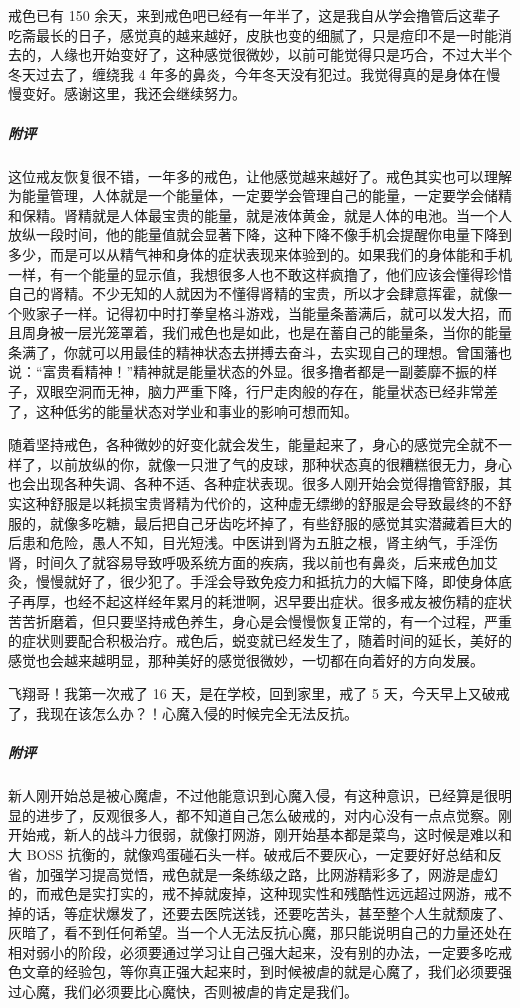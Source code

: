 \begin{case}
    戒色已有 150 余天，来到戒色吧已经有一年半了，这是我自从学会撸管后这辈子吃斋最长的日子，感觉真的越来越好，皮肤也变的细腻了，只是痘印不是一时能消去的，人缘也开始变好了，这种感觉很微妙，以前可能觉得只是巧合，不过大半个冬天过去了，缠绕我 4 年多的鼻炎，今年冬天没有犯过。我觉得真的是身体在慢慢变好。感谢这里，我还会继续努力。
    \subparagraph{附评} 这位戒友恢复很不错，一年多的戒色，让他感觉越来越好了。戒色其实也可以理解为能量管理，人体就是一个能量体，一定要学会管理自己的能量，一定要学会储精和保精。肾精就是人体最宝贵的能量，就是液体黄金，就是人体的电池。当一个人放纵一段时间，他的能量值就会显著下降，这种下降不像手机会提醒你电量下降到多少，而是可以从精气神和身体的症状表现来体验到的。如果我们的身体能和手机一样，有一个能量的显示值，我想很多人也不敢这样疯撸了，他们应该会懂得珍惜自己的肾精。不少无知的人就因为不懂得肾精的宝贵，所以才会肆意挥霍，就像一个败家子一样。记得初中时打拳皇格斗游戏，当能量条蓄满后，就可以发大招，而且周身被一层光笼罩着，我们戒色也是如此，也是在蓄自己的能量条，当你的能量条满了，你就可以用最佳的精神状态去拼搏去奋斗，去实现自己的理想。曾国藩也说：“富贵看精神！”精神就是能量状态的外显。很多撸者都是一副萎靡不振的样子，双眼空洞而无神，脑力严重下降，行尸走肉般的存在，能量状态已经非常差了，这种低劣的能量状态对学业和事业的影响可想而知。

    随着坚持戒色，各种微妙的好变化就会发生，能量起来了，身心的感觉完全就不一样了，以前放纵的你，就像一只泄了气的皮球，那种状态真的很糟糕很无力，身心也会出现各种失调、各种不适、各种症状表现。很多人刚开始会觉得撸管舒服，其实这种舒服是以耗损宝贵肾精为代价的，这种虚无缥缈的舒服是会导致最终的不舒服的，就像多吃糖，最后把自己牙齿吃坏掉了，有些舒服的感觉其实潜藏着巨大的后患和危险，愚人不知，目光短浅。中医讲到肾为五脏之根，肾主纳气，手淫伤肾，时间久了就容易导致呼吸系统方面的疾病，我以前也有鼻炎，后来戒色加艾灸，慢慢就好了，很少犯了。手淫会导致免疫力和抵抗力的大幅下降，即使身体底子再厚，也经不起这样经年累月的耗泄啊，迟早要出症状。很多戒友被伤精的症状苦苦折磨着，但只要坚持戒色养生，身心是会慢慢恢复正常的，有一个过程，严重的症状则要配合积极治疗。戒色后，蜕变就已经发生了，随着时间的延长，美好的感觉也会越来越明显，那种美好的感觉很微妙，一切都在向着好的方向发展。
\end{case}

\begin{case}
    飞翔哥！我第一次戒了 16 天，是在学校，回到家里，戒了 5 天，今天早上又破戒了，我现在该怎么办？！心魔入侵的时候完全无法反抗。
    \subparagraph{附评} 新人刚开始总是被心魔虐，不过他能意识到心魔入侵，有这种意识，已经算是很明显的进步了，反观很多人，都不知道自己怎么破戒的，对内心没有一点点觉察。刚开始戒，新人的战斗力很弱，就像打网游，刚开始基本都是菜鸟，这时候是难以和大 BOSS 抗衡的，就像鸡蛋碰石头一样。破戒后不要灰心，一定要好好总结和反省，加强学习提高觉悟，戒色就是一条练级之路，比网游精彩多了，网游是虚幻的，而戒色是实打实的，戒不掉就废掉，这种现实性和残酷性远远超过网游，戒不掉的话，等症状爆发了，还要去医院送钱，还要吃苦头，甚至整个人生就颓废了、灰暗了，看不到任何希望。当一个人无法反抗心魔，那只能说明自己的力量还处在相对弱小的阶段，必须要通过学习让自己强大起来，没有别的办法，一定要多吃戒色文章的经验包，等你真正强大起来时，到时候被虐的就是心魔了，我们必须要强过心魔，我们必须要比心魔快，否则被虐的肯定是我们。
\end{case}


